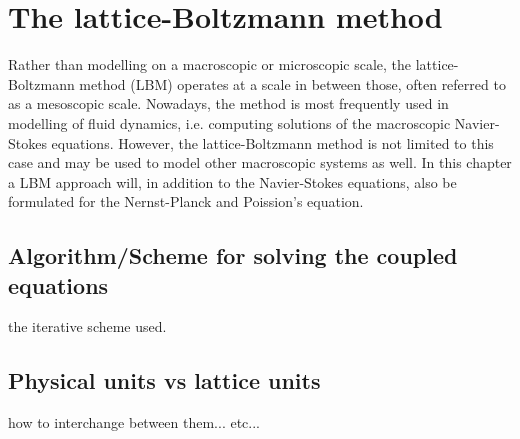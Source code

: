 \chapter{The lattice-Boltzmann method}
Rather than modelling on a macroscopic or microscopic scale, the
lattice-Boltzmann method (LBM) operates at a scale in between those,
often referred to as a mesoscopic scale. Nowadays, the method is most
frequently used in modelling of fluid dynamics, i.e. computing
solutions of the macroscopic Navier-Stokes equations. However, the
lattice-Boltzmann method is not limited to this case and may be used
to model other macroscopic systems as well. In this chapter a LBM
approach will, in addition to the Navier-Stokes equations, also be
formulated for the Nernst-Planck and Poission's equation.



















\section{Algorithm/Scheme for solving the coupled equations}
the iterative scheme used.



\section{Physical units vs lattice units}
how to interchange between them... etc...


